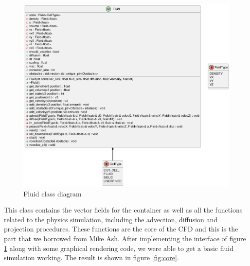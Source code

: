 \documentclass[a4paper,12pt,titlepage]{article}
\begin{document}
\begin{figure}[H]
	\centering
	\includegraphics[width=5.5in]{resources/Fluid.png}
	\caption{Fluid class diagram}
	\label{fig:interface}
\end{figure}

This class contains the vector fields for the container as well as all the
functions related to the physics simulation, including the advection, diffusion
and projection procedures. These functions are the core of the CFD and
this is the part that we borrowed from Mike Ash. After implementing the
interface of figure \ref{fig:interface} along with some graphical
rendering code, we were able to get a basic fluid simulation working. The
result is shown in figure \ref{fig:core}.
\end{document}

